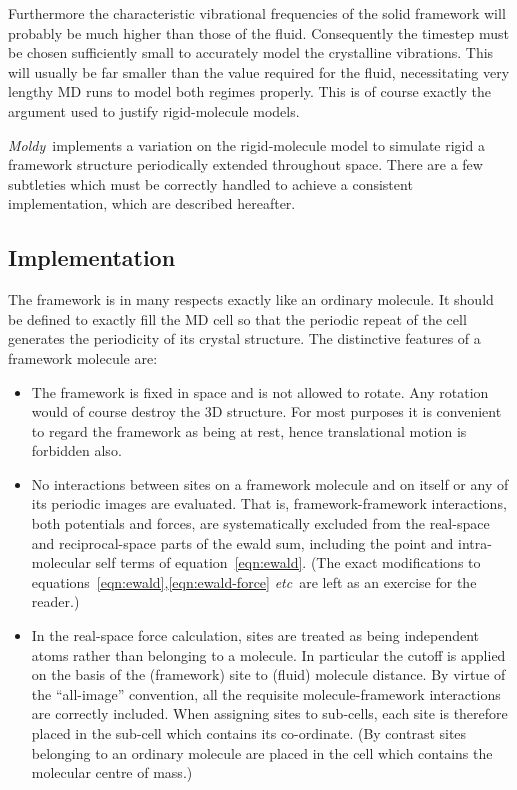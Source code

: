 \documentclass[twoside]{report}
\newcommand{\moldy}{{\em Moldy}}
\newcommand{\etc}{{\em etc}}
\begin{document}
Furthermore the characteristic vibrational frequencies of the solid
framework will probably be much higher than those of the fluid.
Consequently the timestep must be chosen sufficiently small to
accurately model the crystalline vibrations.  This will usually be far
smaller than the value required for the fluid, necessitating very
lengthy MD runs to model both regimes properly.  This is of course
exactly the argument used to justify rigid-molecule models. 

\moldy\ implements a variation on the rigid-molecule model to simulate
rigid a framework structure periodically extended throughout space.
There are a few subtleties which must be correctly handled to achieve
a consistent implementation, which are described hereafter.  

\subsection{Implementation}
The framework is in many respects exactly like an ordinary molecule.
It should be defined to exactly fill the MD cell so that the
periodic repeat of the cell generates the periodicity of its
crystal structure.  The distinctive features of a framework molecule are:
\begin{itemize}
\item The framework is fixed in space and is not allowed to rotate. 
Any rotation would of course destroy the 3D structure.  For most
purposes it is convenient to regard the framework as being at rest, hence
translational motion is forbidden also.
\item No interactions between sites on a framework molecule and on itself
or any of its periodic images are evaluated.  That is,
framework-framework interactions, both potentials and forces, are
systematically excluded from the real-space and reciprocal-space parts
of the ewald sum, including the point and intra-molecular self terms
of equation~\ref{eqn:ewald}. (The exact modifications to
equations~\ref{eqn:ewald},\ref{eqn:ewald-force} \etc\ are left as an
exercise for the reader.)
\item In the real-space force calculation, sites are treated as being
independent atoms rather than belonging to a molecule.  In particular
the cutoff is applied on the basis of the (framework) site to (fluid)
molecule distance.  By virtue of the ``all-image'' convention, all the
requisite molecule-framework interactions are correctly
included.  When assigning sites to sub-cells, each site is therefore
placed in the sub-cell which contains its co-ordinate.  (By contrast
sites belonging to an ordinary molecule are placed in the cell which
contains the molecular centre of mass.)
\end{itemize}
\end{document}
